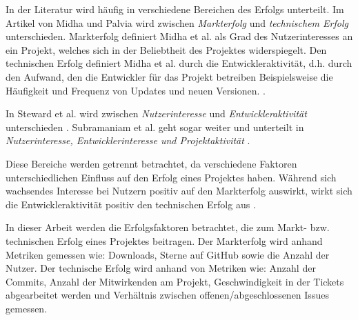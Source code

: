 In der Literatur wird häufig in verschiedene Bereichen des Erfolgs unterteilt.
Im Artikel von Midha und Palvia wird zwischen \textit{Markterfolg} und \textit{technischem Erfolg} unterschieden.
Markterfolg definiert Midha et al.
als Grad des Nutzerinteresses an ein Projekt, %
welches sich in der Beliebtheit des Projektes widerspiegelt.
Den technischen Erfolg definiert Midha et al.
durch die Entwickleraktivität, d.h. durch den Aufwand, den die Entwickler für das Projekt betreiben %
Beispielsweise die Häufigkeit und Frequenz von Updates und neuen Versionen.
\cite{midhaFactorsAffectingSuccess2012}. %


In Steward et al. wird zwischen \textit{Nutzerinteresse} und \textit{Entwickleraktivität} unterschieden
\cite{stewartImpactsLicenseChoice2006a}. %
Subramaniam et al. geht sogar weiter und unterteilt in \textit{Nutzerinteresse, Entwicklerinteresse und Projektaktivität}
\cite{subramaniamDeterminantsOpenSource2009}. %

Diese Bereiche werden getrennt betrachtet, da verschiedene Faktoren unterschiedlichen Einfluss
auf den Erfolg eines Projektes haben.
Während sich wachsendes Interesse bei Nutzern positiv auf den Markterfolg auswirkt,
wirkt sich die Entwickleraktivität positiv den technischen Erfolg aus
\cite{midhaFactorsAffectingSuccess2012, %
    stewartImpactsLicenseChoice2006a}. %

In dieser Arbeit werden die Erfolgsfaktoren betrachtet, die zum Markt- bzw. technischen Erfolg
eines Projektes beitragen.
Der Markterfolg wird anhand Metriken gemessen wie:
Downloads, Sterne auf GitHub sowie die Anzahl der Nutzer.
Der technische Erfolg wird anhand von Metriken wie:
Anzahl der Commits, Anzahl der Mitwirkenden am Projekt,
Geschwindigkeit in der Tickets abgearbeitet werden und Verhältnis zwischen offenen/abgeschlossenen Issues gemessen.


